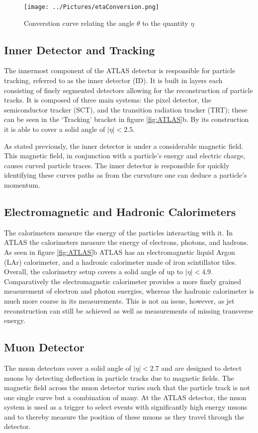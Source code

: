 \begin{figure}[H] %
   \centering
   \texttt{[image: ../Pictures/etaConversion.png]} 
   \caption{Converstion curve relating the angle $\theta$ to the quantity $\eta$}
   \label{fig:etaConversion}
\end{figure}

\subsection{Inner Detector and Tracking}
The innermost component of the ATLAS detector is responsible for particle tracking, referred to as the inner detector (ID).
It is built in layers each consisting of finely segmented detectors allowing for the reconstruction of particle tracks.
It is composed of three main systems: the pixel detector, the semiconductor tracker (SCT), and the transition radiation tracker (TRT); these can be seen in the `Tracking' bracket in figure \ref{fig:ATLAS}b.
By its construction it is able to cover a solid angle of $\left | \eta \right | < 2.5$.

As stated previously, the inner detector is under a considerable magnetic field. 
This magnetic field, in conjunction with a particle's energy and electric charge, causes curved particle traces.
The inner detector is responsible for quickly identifying these curves paths as from the curvature one can deduce a particle's momentum.

\subsection{Electromagnetic and Hadronic Calorimeters}
The calorimeters measure the energy of the particles interacting with it.
In ATLAS the calorimeters measure the energy of electrons, photons, and hadrons.
As seen in figure \ref{fig:ATLAS}b ATLAS has an electromagnetic liquid Argon (LAr) calorimeter, and a hadronic calorimeter made of iron scintillator tiles.
Overall, the calorimetry setup covers a solid angle of up to $\left | \eta \right | < 4.9$.
Comparatively the electromagnetic calorimeter provides a more finely grained measurement of electron and photon energies, whereas the hadronic calorimeter is much more coarse in its measurements.
This is not an issue, however, as jet reconstruction can still be achieved as well as measurements of missing transverse energy.

\subsection{Muon Detector}
The muon detectors cover a solid angle of $\left | \eta \right | < 2.7$ and are designed to detect muons by detecting deflection in particle tracks due to magnetic fields.
The magnetic field across the muon detector varies such that the particle track is not one single curve but a combination of many.
At the ATLAS detector, the muon system is used as a trigger to select events with significantly high energy muons and to thereby measure the position of these muons as they travel through the detector.
